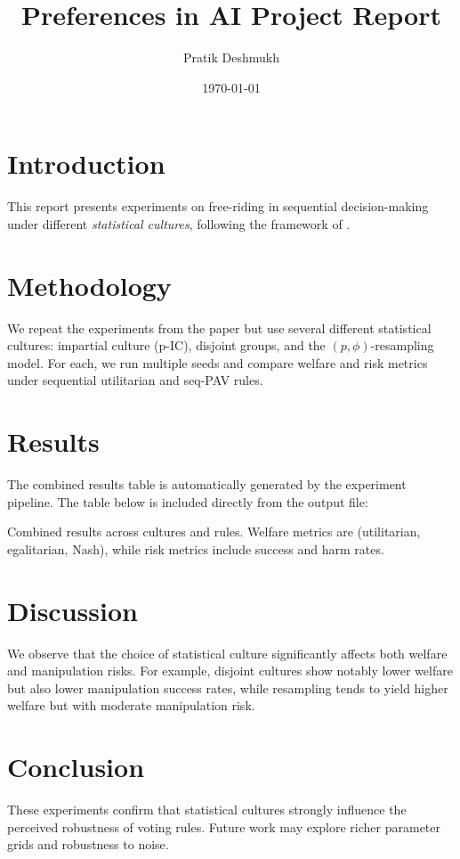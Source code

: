 \documentclass[11pt]{article}
\title{Preferences in AI Project Report}
\author{Pratik Deshmukh}
\date{\today}
\begin{document}
\maketitle

\section{Introduction}
This report presents experiments on free-riding in sequential decision-making
under different \emph{statistical cultures}, following the framework of
\cite{nardi2022}.

\section{Methodology}
We repeat the experiments from the paper but use several different statistical
cultures: impartial culture (p-IC), disjoint groups, and the $(p, \phi)$-resampling
model. For each, we run multiple seeds and compare welfare and risk metrics under
sequential utilitarian and seq-PAV rules.

\section{Results}
The combined results table is automatically generated by the experiment
pipeline. The table below is included directly from the output file:

\begin{table}[h!]
\centering
\resizebox{\textwidth}{!}{%

}
\caption{Combined results across cultures and rules. Welfare metrics are
(utilitarian, egalitarian, Nash), while risk metrics include success and harm
rates.}
\label{tab:combined}
\end{table}

\section{Discussion}
We observe that the choice of statistical culture significantly affects both
welfare and manipulation risks. For example, disjoint cultures show notably
lower welfare but also lower manipulation success rates, while resampling tends
to yield higher welfare but with moderate manipulation risk.

\section{Conclusion}
These experiments confirm that statistical cultures strongly influence the
perceived robustness of voting rules. Future work may explore richer parameter
grids and robustness to noise.
\end{document}
